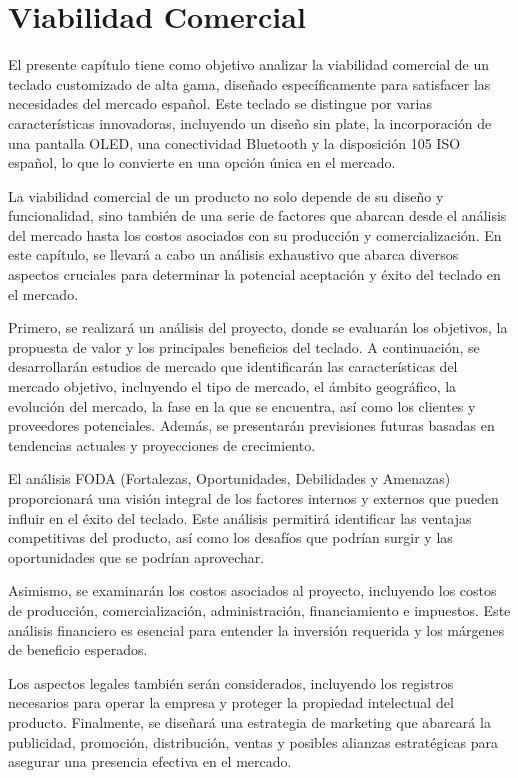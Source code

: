 \chapter{Viabilidad Comercial}

El presente capítulo tiene como objetivo analizar la viabilidad comercial de un teclado customizado de alta gama, diseñado específicamente para satisfacer las necesidades del mercado español. Este teclado se distingue por varias características innovadoras, incluyendo un diseño sin plate, la incorporación de una pantalla OLED, una conectividad Bluetooth y la disposición 105 ISO español, lo que lo convierte en una opción única en el mercado.

La viabilidad comercial de un producto no solo depende de su diseño y funcionalidad, sino también de una serie de factores que abarcan desde el análisis del mercado hasta los costos asociados con su producción y comercialización. En este capítulo, se llevará a cabo un análisis exhaustivo que abarca diversos aspectos cruciales para determinar la potencial aceptación y éxito del teclado en el mercado.

Primero, se realizará un análisis del proyecto, donde se evaluarán los objetivos, la propuesta de valor y los principales beneficios del teclado. A continuación, se desarrollarán estudios de mercado que identificarán las características del mercado objetivo, incluyendo el tipo de mercado, el ámbito geográfico, la evolución del mercado, la fase en la que se encuentra, así como los clientes y proveedores potenciales. Además, se presentarán previsiones futuras basadas en tendencias actuales y proyecciones de crecimiento.

El análisis FODA (Fortalezas, Oportunidades, Debilidades y Amenazas) proporcionará una visión integral de los factores internos y externos que pueden influir en el éxito del teclado. Este análisis permitirá identificar las ventajas competitivas del producto, así como los desafíos que podrían surgir y las oportunidades que se podrían aprovechar.

Asimismo, se examinarán los costos asociados al proyecto, incluyendo los costos de producción, comercialización, administración, financiamiento e impuestos. Este análisis financiero es esencial para entender la inversión requerida y los márgenes de beneficio esperados.

Los aspectos legales también serán considerados, incluyendo los registros necesarios para operar la empresa y proteger la propiedad intelectual del producto. Finalmente, se diseñará una estrategia de marketing que abarcará la publicidad, promoción, distribución, ventas y posibles alianzas estratégicas para asegurar una presencia efectiva en el mercado.

